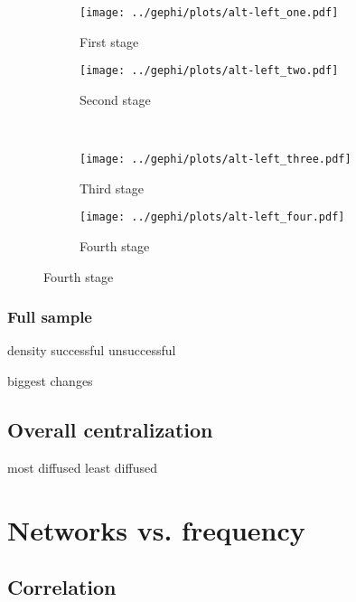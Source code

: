 \documentclass[a4paper, abstract=on]{scrartcl}
\begin{document}
      \begin{figure}[H]
        \caption{Social network of diffusion for  over time.}
        \centering
        \begin{subfigure}{.45\linewidth}
          \caption{First stage}
          \centering
          \texttt{[image: ../gephi/plots/alt-left\_one.pdf]}
        \end{subfigure}
        \begin{subfigure}{.45\linewidth}
          \caption{Second stage}
          \centering
          \texttt{[image: ../gephi/plots/alt-left\_two.pdf]}
        \end{subfigure}\\
        \begin{subfigure}{.45\linewidth}
          \caption{Third stage}
          \centering
          \texttt{[image: ../gephi/plots/alt-left\_three.pdf]}
        \end{subfigure}
        \begin{subfigure}{.45\linewidth}
          \caption{Fourth stage}
          \centering
          \texttt{[image: ../gephi/plots/alt-left\_four.pdf]}
        \end{subfigure}
      \end{figure}

    \subsubsection{Full sample}

      density
        successful
        unsuccessful

      biggest changes

  \subsection{Overall centralization}

    most diffused
    least diffused

\section{Networks vs. frequency}

  \subsection{Correlation}
\end{document}

